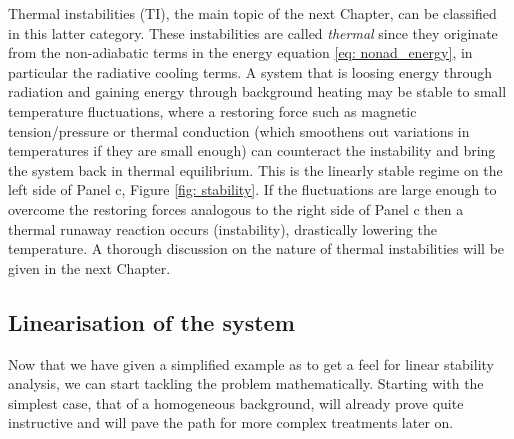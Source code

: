 Thermal instabilities (TI), the main topic of the next Chapter, can be classified in this latter category. These instabilities are called \emph{thermal} since they originate from the non-adiabatic terms in the energy equation \eqref{eq: nonad_energy}, in particular the radiative cooling terms. A system that is loosing energy through radiation and gaining energy through background heating may be stable to small temperature fluctuations, where a restoring force such as magnetic tension/pressure or thermal conduction (which smoothens out variations in temperatures if they are small enough) can counteract the instability and bring the system back in thermal equilibrium. This is the linearly stable regime on the left side of Panel c, Figure \ref{fig: stability}. If the fluctuations are large enough to overcome the restoring forces analogous to the right side of Panel c then a thermal runaway reaction occurs (instability), drastically lowering the temperature. A thorough discussion on the nature of thermal instabilities will be given in the next Chapter.

\subsection{Linearisation of the system}
Now that we have given a simplified example as to get a feel for linear stability analysis, we can start tackling the problem mathematically. Starting with the simplest case, that of a homogeneous background, will already prove quite instructive and will pave the path for more complex treatments later on.

